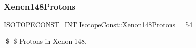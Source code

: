 \subsubsection{\texorpdfstring{Xenon148\+Protons}{Xenon148Protons}}
{\footnotesize\ttfamily \mbox{\hyperlink{group___isotope_const-_macros_ga5f18360b3e99483a35c32d789e62621c}{I\+S\+O\+T\+O\+P\+E\+C\+O\+N\+S\+T\+\_\+\+I\+NT}} Isotope\+Const\+::\+Xenon148\+Protons = 54}

\$ \$ Protons in Xenon-\/148. 